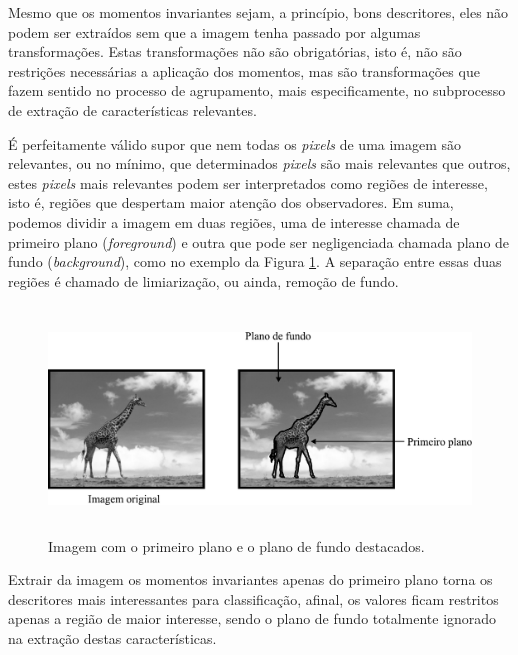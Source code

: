 Mesmo que os momentos invariantes sejam, a princípio, bons descritores, eles
não podem ser extraídos sem que a imagem tenha passado por algumas
transformações. Estas transformações não são obrigatórias, isto é, não são
restrições necessárias a aplicação dos momentos, mas são transformações que
fazem sentido no processo de agrupamento, mais especificamente, no subprocesso
de extração de características relevantes.

É perfeitamente válido supor que nem todas os \textit{pixels} de uma imagem são
relevantes, ou no mínimo, que determinados \textit{pixels} são mais relevantes
que outros, estes \textit{pixels} mais relevantes podem ser interpretados
como regiões de interesse, isto é, regiões que despertam maior atenção dos
observadores. Em suma, podemos dividir a imagem em duas regiões, uma de
interesse chamada de primeiro plano (\textit{foreground}) e outra que pode ser
negligenciada chamada plano de fundo (\textit{background}), como no exemplo
da Figura \ref{fig:girafa_limiarizacao}. A separação entre
essas duas regiões é chamado de limiarização, ou ainda, remoção de fundo.

\begin{figure}[H]
  \begin{center}
    \includegraphics[height=6cm]{imagens/girafa_limiarizacao.pdf}
  \end{center}
  \caption{ Imagem com o primeiro plano e o plano de fundo destacados. }
  \label{fig:girafa_limiarizacao}
\end{figure}

Extrair da imagem os momentos invariantes apenas do primeiro plano
torna os descritores mais interessantes para classificação, afinal, os valores
ficam restritos apenas a região de maior interesse, sendo o plano de fundo
totalmente ignorado na extração destas características.

